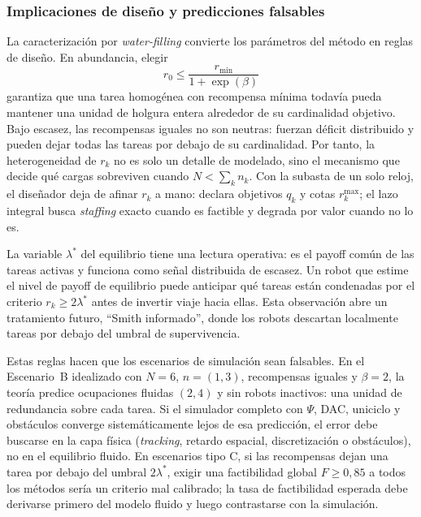 \subsubsection{Implicaciones de diseño y predicciones falsables}
\label{subsubsec:implicaciones_water}

La caracterización por \emph{water-filling} convierte los parámetros del método en
reglas de diseño. En abundancia, elegir
\begin{equation}
  r_0 \leq \frac{r_{\min}}{1+\exp(\beta)}
  \label{eq:idle_slack_rule}
\end{equation}
garantiza que una tarea homogénea con recompensa mínima todavía pueda mantener una
unidad de holgura entera alrededor de su cardinalidad objetivo. Bajo escasez, las
recompensas iguales no son neutras: fuerzan déficit distribuido y pueden dejar todas las
tareas por debajo de su cardinalidad. Por tanto, la heterogeneidad de $r_k$ no es solo un
detalle de modelado, sino el mecanismo que decide qué cargas sobreviven cuando
$N<\sum_k n_k$. Con la subasta de un solo reloj, el diseñador deja de afinar $r_k$ a mano:
declara objetivos $q_k$ y cotas $r_k^{\max}$; el lazo integral busca \emph{staffing}
exacto cuando es factible y degrada por valor cuando no lo es.

La variable $\lambda^*$ del equilibrio tiene una lectura operativa: es el payoff común
de las tareas activas y funciona como señal distribuida de escasez. Un robot que estime
el nivel de payoff de equilibrio puede anticipar qué tareas están condenadas por el
criterio $r_k\ge 2\lambda^*$ antes de invertir viaje hacia ellas. Esta observación abre
un tratamiento futuro, ``Smith informado'', donde los robots descartan localmente tareas
por debajo del umbral de supervivencia.

Estas reglas hacen que los escenarios de simulación sean falsables. En el Escenario~B
idealizado con $N=6$, $n=(1,3)$, recompensas iguales y $\beta=2$, la teoría predice
ocupaciones fluidas $(2,4)$ y sin robots inactivos: una unidad de redundancia sobre cada
tarea. Si el simulador completo con $\Psi$, DAC, uniciclo y obstáculos converge
sistemáticamente lejos de esa predicción, el error debe buscarse en la capa física
(\emph{tracking}, retardo espacial, discretización o obstáculos), no en el equilibrio
fluido. En escenarios tipo C, si las recompensas dejan una tarea por debajo del umbral
$2\lambda^*$, exigir una factibilidad global $F\ge0{,}85$ a todos los métodos sería un
criterio mal calibrado; la tasa de factibilidad esperada debe derivarse primero del
modelo fluido y luego contrastarse con la simulación.

